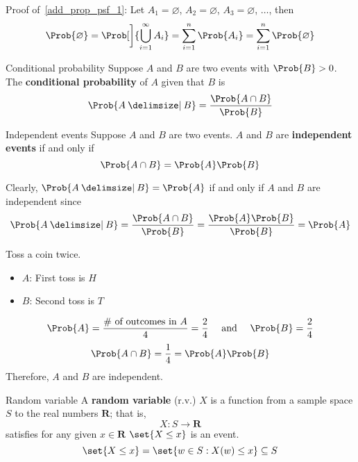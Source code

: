\begin{Proof}{}{}
    Proof of~\ref{add_prop_psf_1}: Let $ A_1=\varnothing $, $ A_2=\varnothing $,
    $ A_3=\varnothing $, $ \ldots $, then
    \[ \Prob{\varnothing}=
        \Prob[\bigg]{\bigcup_{i=1}^\infty A_i}=
        \sum_{i=1}^{n} \Prob{A_i}=\sum_{i=1}^{n}\Prob{\varnothing} \]

\end{Proof}
\begin{Definition}{Conditional probability}{}
    Suppose $ A $ and $ B $ are two events with
    $ \Prob{B}>0 $. The \textbf{conditional probability}
    of $ A $ given that $ B $ is
    \[ \Prob{A\given B}=\frac{\Prob{A\cap B}}{\Prob{B}} \]
\end{Definition}

\begin{Definition}{Independent events}{}
    Suppose $ A $ and $ B $ are two events. $ A $ and
    $ B $ are \textbf{independent events} if and only if
    \[ \Prob{A\cap B}=\Prob{A}\Prob{B} \]
\end{Definition}

Clearly, $ \Prob{A\given B}=\Prob{A} $ if and only if $ A $ and $ B $ are independent since
\[ \Prob{A\given B}=\frac{\Prob{A\cap B}}{\Prob{B}}=\frac{\Prob{A}\Prob{B}}{\Prob{B}}=\Prob{A}  \]

\begin{Example}{}{}
    Toss a coin twice.
    \begin{itemize}
        \item $ A $: First toss is $ H $
        \item $ B $: Second toss is $ T $
    \end{itemize}
    \[ \Prob{A}=\frac{\text{\# of outcomes in }A}{4}=\frac{2}{4}\quad
        \text{ and }\quad \Prob{B}=\frac{2}{4} \]
    \[ \Prob{A\cap B}=\frac{1}{4}=\Prob{A}\Prob{B} \]
    Therefore, $ A $ and $ B $ are independent.
\end{Example}

\begin{Definition}{Random variable}{}
    A \textbf{random variable} (r.v.) $ X $
    is a function from a sample space $ S $ to the real numbers $ \mathbf{R} $; that is,
    \[ X:S\to \mathbf{R} \] satisfies for any given $ x\in\mathbf{R} $
    $ \set{X\le x} $ is an event.
    \[ \set{X\le x}=\set{w\in S:X(w)\le x}
        \subseteq S \]
\end{Definition}

